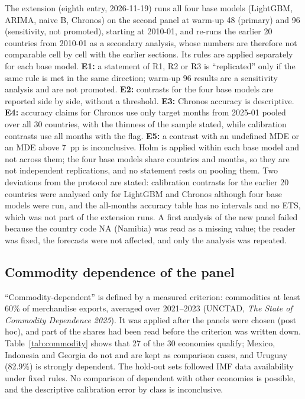 The extension (eighth entry, 2026-11-19) runs all four base models (LightGBM, ARIMA, naive B, Chronos) on the second panel at warm-up 48 (primary) and 96 (sensitivity, not promoted), starting at 2010-01, and re-runs the earlier 20 countries from 2010-01 as a secondary analysis, whose numbers are therefore not comparable cell by cell with the earlier sections. Its rules are applied separately for each base model. \textbf{E1:} a statement of R1, R2 or R3 is ``replicated'' only if the same rule is met in the same direction; warm-up 96 results are a sensitivity analysis and are not promoted. \textbf{E2:} contrasts for the four base models are reported side by side, without a threshold. \textbf{E3:} Chronos accuracy is descriptive. \textbf{E4:} accuracy claims for Chronos use only target months from 2025-01 pooled over all 30 countries, with the thinness of the sample stated, while calibration contrasts use all months with the flag. \textbf{E5:} a contrast with an undefined MDE or an MDE above 7~pp is inconclusive. Holm is applied within each base model and not across them; the four base models share countries and months, so they are not independent replications, and no statement rests on pooling them. Two deviations from the protocol are stated: calibration contrasts for the earlier 20 countries were analysed only for LightGBM and Chronos although four base models were run, and the all-months accuracy table has no intervals and no ETS, which was not part of the extension runs. A first analysis of the new panel failed because the country code NA (Namibia) was read as a missing value; the reader was fixed, the forecasts were not affected, and only the analysis was repeated.

\subsection{Commodity dependence of the panel}\label{sec:scope}

``Commodity-dependent'' is defined by a measured criterion: commodities at least 60\% of merchandise exports, averaged over 2021--2023 (UNCTAD, \emph{The State of Commodity Dependence 2025}). It was applied after the panels were chosen (post hoc), and part of the shares had been read before the criterion was written down. Table~\ref{tab:commodity} shows that 27 of the 30 economies qualify; Mexico, Indonesia and Georgia do not and are kept as comparison cases, and Uruguay (82.9\%) is strongly dependent. The hold-out sets followed IMF data availability under fixed rules. No comparison of dependent with other economies is possible, and the descriptive calibration error by class is inconclusive.

